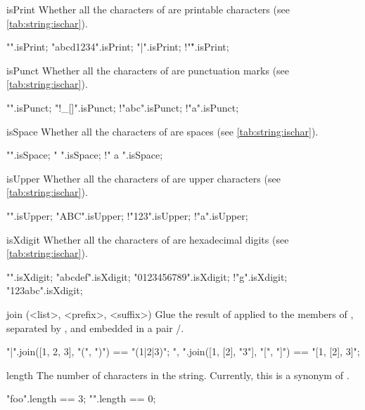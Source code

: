 \begin{urbiscriptapi}
\item[isPrint] Whether all the characters of \this are printable characters
  (see \autoref{tab:string:ischar}).
\begin{urbiassert}
          "".isPrint;
  "abcd1234".isPrint;
       "{|}".isPrint; !"\r".isPrint;
\end{urbiassert}


\item[isPunct] Whether all the characters of \this are punctuation marks
  (see \autoref{tab:string:ischar}).
\begin{urbiassert}
         "".isPunct;
     "!_[]".isPunct;
     !"abc".isPunct;  !"a".isPunct;
\end{urbiassert}


\item[isSpace] Whether all the characters of \this are spaces (see
  \autoref{tab:string:ischar}).
\begin{urbiassert}
          "".isSpace;
       "   ".isSpace;
      !" a ".isSpace;
\end{urbiassert}


\item[isUpper] Whether all the characters of \this are upper characters (see
  \autoref{tab:string:ischar}).
\begin{urbiassert}
          "".isUpper;
       "ABC".isUpper;
      !"123".isUpper; !"a".isUpper;
\end{urbiassert}


\item[isXdigit] Whether all the characters of \this are hexadecimal digits
  (see \autoref{tab:string:ischar}).
\begin{urbiassert}
          "".isXdigit;
    "abcdef".isXdigit;
"0123456789".isXdigit;
        !"g".isXdigit; "123abc".isXdigit;
\end{urbiassert}


\item[join](<list>, <prefix>, <suffix>)%
  Glue the result of  applied to the members of
  , separated by \this, and embedded in a pair
  /.
\begin{urbiassert}
"|".join([1, 2, 3], "(", ")")      == "(1|2|3)";
", ".join([1, [2], "3"], "[", "]") == "[1, [2], 3]";
\end{urbiassert}


\item[length] The number of characters in the string.  Currently, this is a
  synonym of .
\begin{urbiassert}
"foo".length == 3;
   "".length == 0;
\end{urbiassert}



\end{urbiscriptapi}
